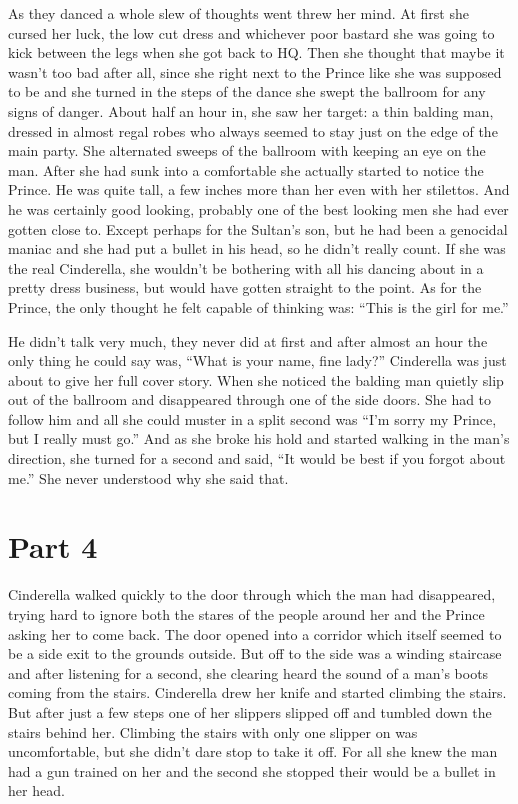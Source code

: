 \documentclass[11pt,letterpaper]{article}
\begin{document}
As they danced a whole slew of thoughts went threw her mind. At first she cursed her luck, the low cut dress and whichever poor bastard she was going to kick between the legs when she got back to HQ. Then she thought that maybe it wasn't too bad after all, since she right next to the Prince like she was supposed to be and she turned in the steps of the dance she swept the ballroom for any signs of danger. About half an hour in, she saw her target: a thin balding man, dressed in almost regal robes who always seemed to stay just on the edge of the main party. She alternated sweeps of the ballroom with keeping an eye on the man. After she had sunk into a comfortable she actually started to notice the Prince. He was quite tall, a few inches more than her even with her stilettos. And he was certainly good looking, probably one of the best looking men she had ever gotten close to. Except perhaps for the Sultan's son, but he had been a genocidal maniac and she had put a bullet in his head, so he didn't really count. If she was the real Cinderella, she wouldn't be bothering with all his dancing about in a pretty dress business, but would have gotten straight to the point. As for the Prince, the only thought he felt capable of thinking was: ``This is the girl for me.''

He didn't talk very much, they never did at first and after almost an hour the only thing he could say was, ``What is your name, fine lady?'' Cinderella was just about to give her full cover story. When she noticed the balding man quietly slip out of the ballroom and disappeared through one of the side doors. She had to follow him and all she could muster in a split second was ``I'm sorry my Prince, but I really must go.'' And as she broke his hold and started walking in the man's direction, she turned for a second and said, ``It would be best if you forgot about me.'' She never understood why she said that.

\section*{Part 4}

Cinderella walked quickly to the door through which the man had disappeared, trying hard to ignore both the stares of the people around her and the Prince asking her to come back. The door opened into a corridor which itself seemed to be a side exit to the grounds outside. But off to the side was a winding staircase and after listening for a second, she clearing heard the sound of a man's boots coming from the stairs. Cinderella drew her knife and started climbing the stairs. But after just a few steps one of her slippers slipped off and tumbled down the stairs behind her. Climbing the stairs with only one slipper on was uncomfortable, but she didn't dare stop to take it off. For all she knew the man had a gun trained on her and the second she stopped their would be a bullet in her head.
\end{document}
